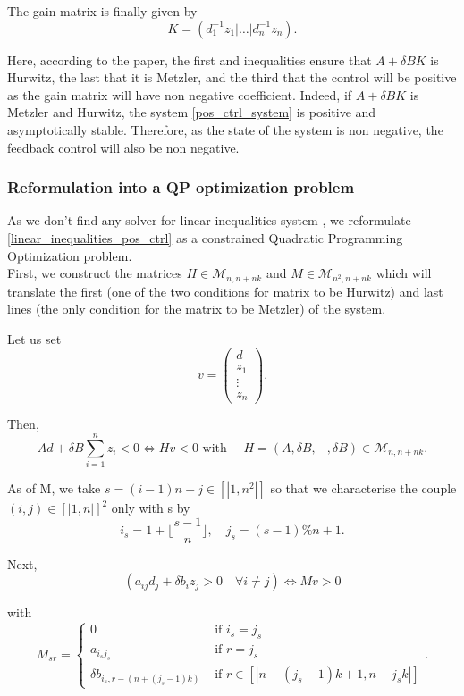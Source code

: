 \documentclass[12pt]{article}
\begin{document}
The gain matrix is finally given by 
\begin{equation}
\boxed{
    K = (d_1^{-1}z_1| \dots |d_n^{-1}z_n).
}
\end{equation}

Here, according to the paper, the first and inequalities ensure that $A+\delta BK$ is Hurwitz, the last that it is Metzler, and the third that the control will be positive as the gain matrix will have non negative coefficient. Indeed, if $A+\delta BK$ is Metzler and Hurwitz, the system \eqref{pos_ctrl_system} is positive and asymptotically stable. Therefore, as the state of the system is non negative, the feedback control will also be non negative. 

\subsubsection{Reformulation into a QP optimization problem}
As we don't find any solver for linear inequalities system , we reformulate  \eqref{linear_inequalities_pos_ctrl} as a constrained Quadratic Programming Optimization problem.
\\

First, we construct the matrices $H \in \mathcal{M}_{n,n+nk}$ and $M \in \mathcal{M}_{n^2,n+nk}$ which will translate the first (one of the two conditions for matrix to be Hurwitz) and last lines (the only condition for the matrix to be Metzler) of the system. 

 Let us set $$v=\begin{pmatrix}d\\ z_1 \\ \vdots \\ z_n
\end{pmatrix}.$$

Then, 
$$Ad + \delta B\sum_{i=1}^n z_i <0 \Leftrightarrow H
v
<0 \text{ with } \quad H = (A,\delta B,-,\delta B) \in \mathcal{M}_{n,n+nk}.$$

As of M, we take $s = (i-1)n + j \in [|1,n^2|]$ so that we characterise the couple $(i,j) \in [|1,n|]^2$ only with s by
$$i_s = 1+\lfloor\frac{s-1}{n}\rfloor, \quad j_s=(s-1)\%n+1.$$

Next, $$(a_{ij}d_j+\delta b_iz_j >0 \quad \forall i \neq j )\Leftrightarrow Mv > 0$$

with
$$M_{sr} = 
\left\{ \begin{aligned}
0 &\text{ if } i_s=j_s \\
a_{i_s j_s} &\text{ if } r=j_s\\
\delta b_{i_s,r-(n+(j_s-1)k)} &\text{ if } r\in [|n+(j_s-1)k+1, n+j_sk|]
\end{aligned}\right. .$$
\\
\end{document}
